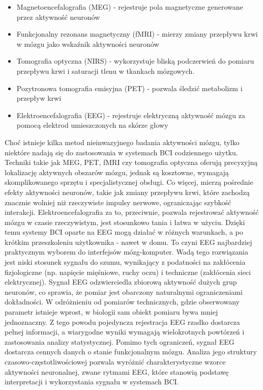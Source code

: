\begin{itemize}
    \item Magnetoencefalografia (MEG) - rejestruje pola magnetyczne generowane przez aktywność neuronów
    \item Funkcjonalny rezonans magnetyczny (fMRI) - mierzy zmiany przepływu krwi w mózgu jako wskaźnik aktywności neuronów
    \item Tomografia optyczna (NIRS) - wykorzystuje bliską podczerwień do pomiaru przepływu krwi i saturacji tlenu w tkankach mózgowych.
    \item Pozytronowa tomografia emisyjna (PET) - pozwala śledzić metabolizm i przepływ krwi
    \item Elektroencefalografia (EEG) - rejestruje elektryczną aktywność mózgu za pomocą elektrod umieszczonych na skórze głowy
\end{itemize}

Choć istnieje kilka metod nieinwazyjnego badania aktywności mózgu, tylko niektóre nadają się do zastosowania w systemach BCI codziennego użytku. Techniki takie jak MEG, PET, fMRI czy tomografia optyczna oferują precyzyjną lokalizację aktywnych obszarów mózgu, jednak są kosztowne, wymagają skomplikowanego sprzętu i specjalistycznej obsługi. Co więcej, mierzą pośrednie efekty aktywności neuronów, takie jak zmiany przepływu krwi, które zachodzą znacznie wolniej niż rzeczywiste impulsy nerwowe, ograniczając szybkość interakcji. Elektroencefalografia za to, przeciwnie, pozwala rejestrować aktywność mózgu w czasie rzeczywistym, jest stosunkowo tania i łatwa w użyciu. Dzięki temu systemy BCI oparte na EEG mogą działać w różnych warunkach, a po krótkim przeszkoleniu użytkownika - nawet w domu. To czyni EEG najbardziej praktycznym wyborem do interfejsów mózg-komputer. Wadą tego rozwiązania jest niski stosunek sygnału do szumu, wynikający z podatności na zakłócenia fizjologiczne (np. napięcie mięśniowe, ruchy oczu) i techniczne (zakłócenia sieci elektrycznej).
Sygnał EEG odzwierciedla zbiorową aktywność dużych grup neuronów, co sprawia, że pomiar jest obarczony naturalnymi ograniczeniami dokładności. W odróżnieniu od pomiarów technicznych, gdzie obserwowany parametr istnieje wprost, w biologii sam obiekt pomiaru bywa mniej jednoznaczny. Z tego powodu pojedyncza rejestracja EEG rzadko dostarcza pełnej informacji, a wiarygodne wyniki wymagają wielokrotnych powtórzeń i zastosowania analizy statystycznej. Pomimo tych ograniczeń, sygnał EEG dostarcza cennych danych o stanie funkcjonalnym mózgu. Analiza jego struktury czasowo-częstotliwościowej pozwala wyróżnić charakterystyczne wzorce aktywności neuronalnej, zwane rytmami EEG, które stanowią podstawę interpretacji i wykorzystania sygnału w systemach BCI.

